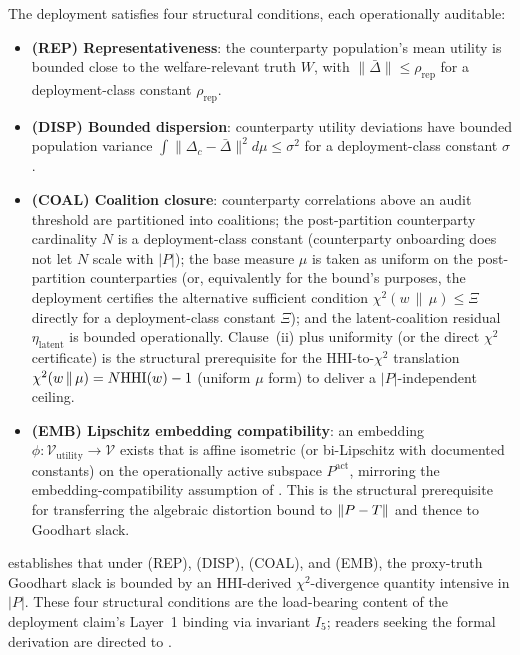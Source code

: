 \begin{assumption}
\label{ass:concgap_conditions}
The deployment satisfies four structural conditions, each
operationally auditable:
\begin{itemize}
\item \textbf{(REP) Representativeness}: the counterparty
  population's mean utility is bounded close to the
  welfare-relevant truth $W$, with $\|\bar\Delta\| \leq
  \rho_{\mathrm{rep}}$ for a deployment-class constant
  $\rho_{\mathrm{rep}}$.
\item \textbf{(DISP) Bounded dispersion}: counterparty utility
  deviations have bounded population variance $\int \|\Delta_c -
  \bar\Delta\|^2 d\mu \leq \sigma^2$ for a deployment-class
  constant $\sigma$.
\item \textbf{(COAL) Coalition closure}: counterparty correlations
  above an audit threshold are partitioned into coalitions; the
  post-partition counterparty cardinality $N$ is a deployment-class
  constant (counterparty onboarding does not let $N$ scale with
  $|P|$); the base measure $\mu$ is taken as uniform on the
  post-partition counterparties (or, equivalently for the bound's
  purposes, the deployment certifies the alternative sufficient
  condition $\chi^2(w \,\|\, \mu) \leq \Xi$ directly for a
  deployment-class constant $\Xi$); and the latent-coalition
  residual $\eta_{\mathrm{latent}}$ is bounded operationally.
  Clause~(ii) plus uniformity (or the direct $\chi^2$
  certificate) is the structural prerequisite for the
  HHI-to-$\chi^2$ translation $\chi^2(w \,\|\, \mu) = N \mathrm{HHI}(w) -
  1$ (uniform $\mu$ form) to deliver a $|P|$-independent ceiling.
\item \textbf{(EMB) Lipschitz embedding compatibility}: an
  embedding $\phi: \mathcal{V}_\mathrm{utility} \to \mathcal{V}$
  exists that is affine isometric (or bi-Lipschitz with
  documented constants) on the operationally active subspace
  $P^{\mathrm{act}}$, mirroring the embedding-compatibility
  assumption of \citep{lasser2026foundations}.  This is the
  structural prerequisite for transferring the algebraic
  distortion bound to $\|P - T\|$ and thence to
  Goodhart slack.
\end{itemize}

\citep[Theorem~2]{lasser2026foundations} establishes that under
(REP), (DISP), (COAL), and (EMB), the proxy-truth Goodhart slack
is bounded by an HHI-derived $\chi^2$-divergence quantity
intensive in $|P|$.  These four structural conditions are the
load-bearing content of the deployment claim's Layer~1 binding
via invariant $I_5$; readers seeking the formal derivation are
directed to \citep[\S 4]{lasser2026foundations}.
\end{assumption}

